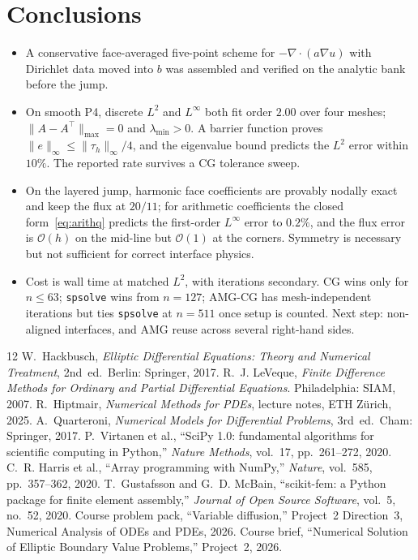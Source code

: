 \documentclass[11pt,a4paper]{article}
\begin{document}
\section{Conclusions}
\label{sec:conc}
\begin{itemize}[leftmargin=1.2em]
  \item A conservative face-averaged five-point scheme for \(-\nabla\cdot(a\nabla u)\) with Dirichlet data moved into \(b\) was assembled and verified on the analytic bank before the jump.
  \item On smooth P4, discrete \(L^2\) and \(L^\infty\) both fit order \(2.00\) over four meshes; \(\|A-A^\top\|_{\max}=0\) and \(\lambda_{\min}>0\). A barrier function proves \(\|e\|_\infty\le\|\tau_h\|_\infty/4\), and the eigenvalue bound predicts the \(L^2\) error within \(10\%\). The reported rate survives a CG tolerance sweep.
  \item On the layered jump, harmonic face coefficients are provably nodally exact and keep the flux at \(20/11\); for arithmetic coefficients the closed form~\eqref{eq:arithq} predicts the first-order \(L^\infty\) error to \(0.2\%\), and the flux error is \(\mathcal{O}(h)\) on the mid-line but \(\mathcal{O}(1)\) at the corners. Symmetry is necessary but not sufficient for correct interface physics.
  \item Cost is wall time at matched \(L^2\), with iterations secondary. CG wins only for \(n\le 63\); \texttt{spsolve} wins from \(n=127\); AMG-CG has mesh-independent iterations but ties \texttt{spsolve} at \(n=511\) once setup is counted. Next step: non-aligned interfaces, and AMG reuse across several right-hand sides.
\end{itemize}

\FloatBarrier
\begin{thebibliography}{12}
W.~Hackbusch, \emph{Elliptic Differential Equations: Theory and Numerical Treatment}, 2nd~ed.\ Berlin: Springer, 2017.
R.~J. LeVeque, \emph{Finite Difference Methods for Ordinary and Partial Differential Equations}. Philadelphia: SIAM, 2007.
R.~Hiptmair, \emph{Numerical Methods for PDEs}, lecture notes, ETH Z\"urich, 2025.
A.~Quarteroni, \emph{Numerical Models for Differential Problems}, 3rd~ed.\ Cham: Springer, 2017.
P.~Virtanen et al., ``SciPy 1.0: fundamental algorithms for scientific computing in Python,'' \emph{Nature Methods}, vol.~17, pp.~261--272, 2020.
C.~R. Harris et al., ``Array programming with NumPy,'' \emph{Nature}, vol.~585, pp.~357--362, 2020.
T.~Gustafsson and G.~D. McBain, ``scikit-fem: a Python package for finite element assembly,'' \emph{Journal of Open Source Software}, vol.~5, no.~52, 2020.
Course problem pack, ``Variable diffusion,'' Project~2 Direction~3, Numerical Analysis of ODEs and PDEs, 2026.
Course brief, ``Numerical Solution of Elliptic Boundary Value Problems,'' Project~2, 2026.
\end{thebibliography}
\end{document}
